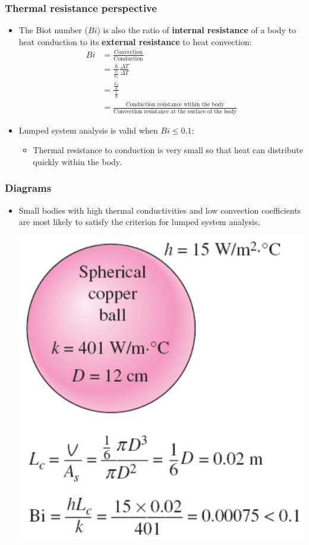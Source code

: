 \documentclass[11pt]{article}
\begin{document}
\subsubsection{Thermal resistance perspective}
\label{sec:org7dc85d1}
\begin{itemize}
\item The Biot number (\(Bi\)) is also the ratio of \textbf{internal resistance} of a body to heat conduction to its \textbf{external resistance} to heat convection:
\begin{align*}
Bi &= \frac{\text{Convection}}{\text{Conduction}} \\
&= \frac{h}{\frac{k}{L_c}} \frac{\Delta T}{\Delta T} \\
&= \frac{\frac{L_c}{k}}{\frac{1}{h}} \\
&= \frac{\text{Conduction resistance within the body}}{\text{Convection resistance at the surface of the body}}
\end{align*}
\item Lumped system analysis is valid when \(Bi \le 0.1\):
\begin{itemize}
\item Thermal resistance to conduction is very small so that heat can distribute quickly within the body.
\end{itemize}
\end{itemize}

 \newpage

\subsubsection{Diagrams}
\label{sec:org31b5a7d}
\begin{itemize}
\item Small bodies with high thermal conductivities and low convection coefficients are most likely to satisfy the criterion for lumped system analysis.
\begin{center}
\includegraphics[width=.9\linewidth]{./images/biot-number-spherical-copper-ball.png}
\end{center}
\end{itemize}
\end{document}

